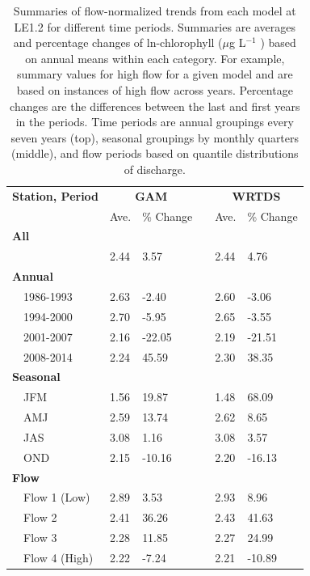 \documentclass[letterpaper,12pt,oneside]{article}\usepackage[]{graphicx}\usepackage[]{color}
\newcommand{\mugl}{$\mu$g L$^{-1}$ }
\begin{document}
\begin{table}[!tbp]
\caption{Summaries of flow-normalized trends from each model at LE1.2 for different time periods.  Summaries are averages and percentage changes of ln-chlorophyll (\mugl) based on annual means within each category.  For example, summary values for high flow for a given model and are based on instances of high flow across years.  Percentage changes are the differences between the last and first years in the periods.  Time periods are annual groupings every seven years (top), seasonal groupings by monthly quarters (middle), and flow periods based on quantile distributions of discharge.\label{tab:trendsTF16}} 
\begin{center}
\begin{tabular}{lllcll}
\hline\hline
\multicolumn{1}{l}{\bfseries Station, Period}&\multicolumn{2}{c}{\bfseries GAM}&\multicolumn{1}{c}{\bfseries }&\multicolumn{2}{c}{\bfseries WRTDS}\tabularnewline
\cline{2-3} \cline{5-6}
\multicolumn{1}{l}{}&\multicolumn{1}{c}{Ave.}&\multicolumn{1}{c}{\% Change}&\multicolumn{1}{c}{}&\multicolumn{1}{c}{Ave.}&\multicolumn{1}{c}{\% Change}\tabularnewline
\hline
{\bfseries All}&&&&&\tabularnewline
~~&2.44&  3.57&&2.44&  4.76\tabularnewline
\hline
{\bfseries Annual}&&&&&\tabularnewline
~~1986-1993&2.63& -2.40&&2.60& -3.06\tabularnewline
~~1994-2000&2.70& -5.95&&2.65& -3.55\tabularnewline
~~2001-2007&2.16&-22.05&&2.19&-21.51\tabularnewline
~~2008-2014&2.24& 45.59&&2.30& 38.35\tabularnewline
\hline
{\bfseries Seasonal}&&&&&\tabularnewline
~~JFM&1.56& 19.87&&1.48& 68.09\tabularnewline
~~AMJ&2.59& 13.74&&2.62&  8.65\tabularnewline
~~JAS&3.08&  1.16&&3.08&  3.57\tabularnewline
~~OND&2.15&-10.16&&2.20&-16.13\tabularnewline
\hline
{\bfseries Flow}&&&&&\tabularnewline
~~Flow 1 (Low)&2.89&  3.53&&2.93&  8.96\tabularnewline
~~Flow 2&2.41& 36.26&&2.43& 41.63\tabularnewline
~~Flow 3&2.28& 11.85&&2.27& 24.99\tabularnewline
~~Flow 4 (High)&2.22& -7.24&&2.21&-10.89\tabularnewline
\hline
\end{tabular}\end{center}

\end{table}
\end{document}
